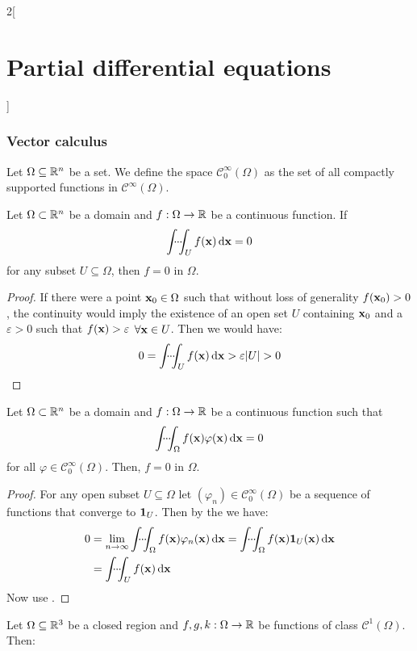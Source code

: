 \documentclass[../../../main_math.tex]{subfiles}
\begin{document}
\begin{multicols}{2}[\section{Partial differential equations}]
  \subsubsection{Vector calculus}
  \begin{definition}
    Let $\Omega\subseteq \mathbb{R}^n$ be a set. We define the space $\mathcal{C}_0^\infty(\Omega)$ as the set of all compactly supported functions in $\mathcal{C}^\infty(\Omega)$.
  \end{definition}
  \begin{important}
    \begin{theorem}\label{PDE:fundamentallemma}
      Let $\Omega\subset\mathbb{R}^n$ be a domain and $f:\Omega\rightarrow\mathbb{R}$ be a continuous function. If $$\dotsint_U f(\vf{x})\dd{\vf{x}}=0$$ for any subset  $U\subseteq\Omega$, then $f=0$ in $\Omega$.
    \end{theorem}
  \end{important}
  \begin{proof}
    If there were a point $\boldsymbol{\mathrm{x}}_0\in \Omega$ such that without loss of generality $f(\boldsymbol{\mathrm{x}}_0)>0$, the continuity would imply the existence of an open set $U$ containing $\boldsymbol{\mathrm{x}}_0$ and a $\varepsilon >0$ such that $f(\boldsymbol{\mathrm{x}})>\varepsilon$ $\forall \boldsymbol{\mathrm{x}}\in U$. Then we would have: $$0=\dotsint_U f(\vf{x})\dd{\vf{x}}>\varepsilon\abs{U}>0$$
  \end{proof}
  \begin{theorem}\label{PDE:postfundamentallemma}
    Let $\Omega\subset\mathbb{R}^n$ be a domain and $f:\Omega\rightarrow\mathbb{R}$ be a continuous function such that $$\dotsint_\Omega f(\vf{x})\varphi(\vf{x})\dd{\vf{x}}=0$$ for all $\varphi\in\mathcal{C}_0^\infty(\Omega)$. Then, $f=0$ in $\Omega$.
  \end{theorem}
  \begin{proof}
    For any open subset $U\subseteq \Omega$ let $(\varphi_n)\in\mathcal{C}_0^\infty(\Omega)$ be a sequence of functions that converge to $\boldsymbol{\mathrm{1}}_{U}$. Then by the  we have:
    \begin{align*}
      0 & = \lim_{n\to\infty}\dotsint_\Omega f(\vf{x})\varphi_n(\vf{x})\dd{\vf{x}}=\dotsint_\Omega f(\vf{x})\indi{U}(\vf{x})\dd{\vf{x}} \\
        & =\dotsint_U f(\vf{x})\dd{\vf{x}}
    \end{align*}
    Now use .
  \end{proof}
  \begin{proposition}
    Let $\Omega\subseteq\mathbb{R}^3$ be a closed region and $f,g,k:\Omega\rightarrow\mathbb{R}$ be functions of class $\mathcal{C}^1(\Omega)$. Then:

\end{proposition}
\end{multicols}
\end{document}

